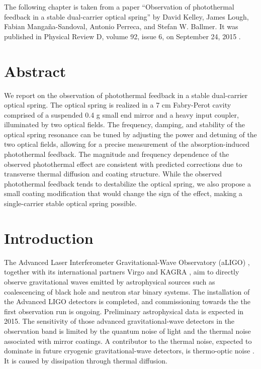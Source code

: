 \newcommand{\irm}{\mathrm{i}}

\newcommand{\del}[0]{{}_{{}^\triangle}\!}
\newcommand{\vk}[0]{{\bf k}}
\newcommand{\w}[0]{{\rm w}}
\newcommand{\omg}[0]{{{\Omega}}}
\newcommand{\eq}[1]{equation \ref{#1}}

The following chapter is taken from a paper ``Observation of photothermal feedback in a stable dual-carrier optical spring'' by
David Kelley, James Lough, Fabian Mangaña-Sandoval, Antonio Perreca, and Stefan W. Ballmer. 
It was published in Physical Review D, volume 92, issue 6, on September 24, 2015 \cite{Kelley15}.

\section{Abstract}

We report on the observation of photothermal feedback in a stable dual-carrier optical spring. The optical spring is realized in a 7 cm Fabry-Perot cavity comprised of a suspended 0.4 g small end mirror and a heavy input coupler, illuminated by two optical fields. The frequency, damping, and stability of the optical spring resonance can be tuned by adjusting the power and detuning of the two optical fields, allowing for a precise measurement of the absorption-induced photothermal feedback. The magnitude and frequency dependence of the observed photothermal effect are consistent with predicted corrections due to transverse thermal diffusion and coating structure. While the observed photothermal feedback tends to destabilize the optical spring, we also propose a small coating modification that would change the sign of the effect, making a single-carrier stable optical spring possible.

\section{Introduction}
The Advanced Laser Interferometer Gravitational-Wave Observatory (aLIGO) \cite{Harry2010}, together with its international partners Virgo \cite{2013ASPC..467..151D} and KAGRA \cite{Somiya:2011np}, aim to directly observe gravitational waves emitted by astrophysical sources such as coalescencing of black hole and neutron star binary systems. The installation 
of the Advanced LIGO detectors is completed, and commissioning towards the the first observation run is ongoing. Preliminary astrophysical data is expected in 2015. The sensitivity of those advanced gravitational-wave detectors in the observation band is limited by the quantum noise of light and the thermal noise associated with mirror coatings. A contributor to the thermal noise, expected to dominate in future cryogenic gravitational-wave detectors, is thermo-optic noise \cite{Braginsky2000303, PhysRevD.63.082003, PhysRevD.78.102003}. It is caused by dissipation through thermal diffusion.

